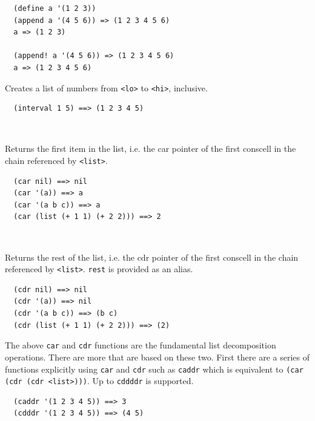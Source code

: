 \documentclass[12pt]{article}
\begin{document}
\begin{verbatim}
  (define a '(1 2 3))
  (append a '(4 5 6)) => (1 2 3 4 5 6)
  a => (1 2 3)

  (append! a '(4 5 6)) => (1 2 3 4 5 6)
  a => (1 2 3 4 5 6)
\end{verbatim}


Creates a list of numbers from \verb|<lo>| to \verb|<hi>|, inclusive.

\begin{verbatim}
  (interval 1 5) ==> (1 2 3 4 5)
\end{verbatim}

\\

Returns the first item in the list, i.e. the car pointer of the first
conscell in the chain referenced by \verb|<list>|.

\begin{verbatim}
  (car nil) ==> nil
  (car '(a)) ==> a
  (car '(a b c)) ==> a
  (car (list (+ 1 1) (+ 2 2))) ==> 2
\end{verbatim}

\\

Returns the rest of the list, i.e. the cdr pointer of the first
conscell in the chain referenced by \verb|<list>|. \verb|rest| is provided as an alias.

\begin{verbatim}
  (cdr nil) ==> nil
  (cdr '(a)) ==> nil
  (cdr '(a b c)) ==> (b c)
  (cdr (list (+ 1 1) (+ 2 2))) ==> (2)
\end{verbatim}

The above \verb|car| and \verb|cdr| functions are the fundamental list
decomposition operations. There are more that are based on these two.
First there are a series of functions explicitly using \verb|car| and
\verb|cdr| such as \verb|caddr| which is equivalent to
\verb|(car (cdr (cdr <list>)))|. Up to \verb|cddddr| is supported.

\begin{verbatim}
  (caddr '(1 2 3 4 5)) ==> 3
  (cdddr '(1 2 3 4 5)) ==> (4 5)
\end{verbatim}

\\
\\
\\
\\
\end{document}
